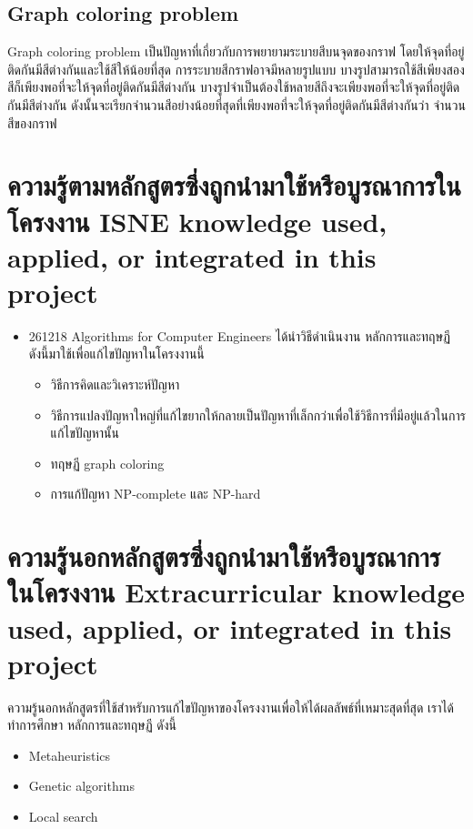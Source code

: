 \subsection{Graph coloring problem}
Graph coloring problem เป็นปัญหาที่เกี่ยวกับการพยายามระบายสีบนจุดของกราฟ โดยให้จุดที่อยู่ติดกันมีสีต่างกันและใช้สีให้น้อยที่สุด
การระบายสีกราฟอาจมีหลายรูปแบบ บางรูปสามารถใช้สีเพียงสองสีก็เพียงพอที่จะให้จุดที่อยู่ติดกันมีสีต่างกัน บางรูปจำเป็นต้องใช้หลายสีถึงจะเพียงพอที่จะให้จุดที่อยู่ติดกันมีสีต่างกัน 
ดังนั้นจะเรียกจำนวนสีอย่างน้อยที่สุดที่เพียงพอที่จะให้จุดที่อยู่ติดกันมีสีต่างกันว่า จำนวนสีของกราฟ
\section{\ifcpe%
ความรู้ตามหลักสูตรซึ่งถูกนำมาใช้หรือบูรณาการในโครงงาน
\else%
ISNE knowledge used, applied, or integrated in this project
\fi
}
\begin{itemize}
  \item 261218 Algorithms for Computer Engineers ได้นำวิธีดำเนินงาน หลักการและทฤษฏี ดังนี้มาใช้เพื่อแก้ไขปัญหาในโครงงานนี้  
  \begin{itemize}
  \item วิธีการคิดและวิเคราะห์ปัญหา
  \item วิธีการแปลงปัญหาใหญ่ที่แก้ไขยากให้กลายเป็นปัญหาที่เล็กกว่าเพื่อใช้วิธีการที่มีอยู่แล้วในการแก้ไขปัญหานั้น
  \item ทฤษฏี graph coloring
  \item การแก้ปัญหา NP-complete และ NP-hard
  \end{itemize}
\end{itemize}

\section{\ifcpe%
ความรู้นอกหลักสูตรซึ่งถูกนำมาใช้หรือบูรณาการในโครงงาน
\else%
Extracurricular knowledge used, applied, or integrated in this project
\fi
}
ความรู้นอกหลักสูตรที่ใช้สำหรับการแก้ไขปัญหาของโครงงานเพื่อให้ได้ผลลัพธ์ที่เหมาะสุดที่สุด เราได้ทำการศึกษา หลักการและทฤษฏี ดังนี้
\begin{itemize}
  \item Meta­heuristics
  \item Genetic algorithms
  \item Local search
\end{itemize}
